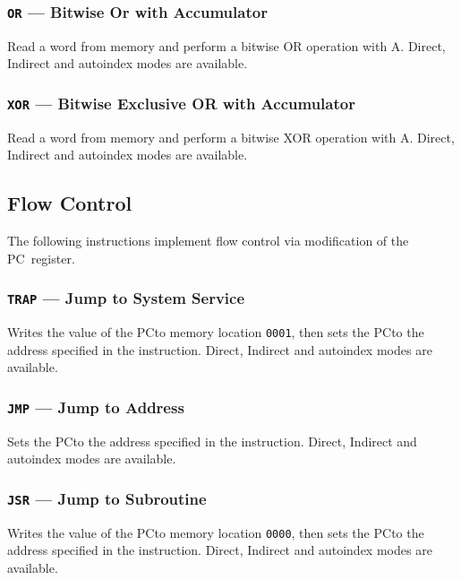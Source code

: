 \documentclass[11pt,a4paper,twocolumns]{article}
\newcommand\register[1]{\textsf{#1}}
\newcommand\PC{\register{PC}}
\begin{document}
\subsubsection{{\tt OR} — Bitwise Or with Accumulator}
\label{sec-or}

Read a word from memory and perform a bitwise OR operation with A. Direct, Indirect and autoindex
modes are available.

\subsubsection{{\tt XOR} — Bitwise Exclusive OR with Accumulator}
\label{sec-xor}

Read a word from memory and perform a bitwise XOR operation with A. Direct, Indirect and autoindex
modes are available.

\subsection{Flow Control}

The following instructions implement flow control via modification of the \PC\ register.

\subsubsection{{\tt TRAP} — Jump to System Service}
\label{sec-trap}

Writes the value of the \PC to memory location {\tt 0001}, then sets
the \PC to the address specified in the instruction. Direct, Indirect
and autoindex modes are available.

\subsubsection{{\tt JMP} — Jump to Address}
\label{sec-jmp}

Sets the \PC to the address specified in the instruction. Direct,
Indirect and autoindex modes are available.

\subsubsection{{\tt JSR} — Jump to Subroutine}
\label{sec-jsr}

Writes the value of the \PC to memory location {\tt 0000}, then sets
the \PC to the address specified in the instruction. Direct, Indirect
and autoindex modes are available.
\end{document}

